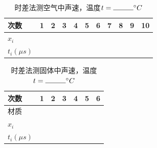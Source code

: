 \documentclass{ctexart}
\begin{document}
\begin{table}[!h]
    \centering
    \caption{时差法测空气中声速，温度$t = \rule{1cm}{0.4pt} ^\circ C$}
    \begin{tabular}{|m{1.5cm}<{\centering}|m{0.7cm}<{\centering}|m{0.7cm}<{\centering}|m{0.7cm}<{\centering}|m{0.7cm}<{\centering}|m{0.7cm}<{\centering}|m{0.7cm}<{\centering}|m{0.7cm}<{\centering}|m{0.7cm}<{\centering}|m{0.7cm}<{\centering}|m{0.7cm}<{\centering}|}
        \hline
        次数& 1 & 2 & 3 & 4 & 5 & 6 & 7 & 8 & 9 & 10 \\ 
        \hline
        $x_i$& & & & & & & & & & \\
        \hline
        $t_i(\mu s)$& & & & & & & & & & \\
        \hline
    \end{tabular}
\end{table}

\begin{table}[!h]
    \centering
    \caption{时差法测固体中声速，温度$t = \rule{1cm}{0.4pt} ^\circ C$}
    \begin{tabular}{|m{1.5cm}<{\centering}|m{1.2cm}<{\centering}|m{1.2cm}<{\centering}|m{1.2cm}<{\centering}|m{1.2cm}<{\centering}|m{1.2cm}<{\centering}|m{1.2cm}<{\centering}|}
        \hline
        次数& 1 & 2 & 3 & 4 & 5 & 6  \\ 
        \hline
        材质& \multicolumn{3}{c|}{} & \multicolumn{3}{c|}{} \\
        \hline
        $x_i$& & & & & &  \\
        \hline
        $t_i(\mu s)$& & & & & & \\
        \hline
    \end{tabular}
\end{table}


\newpage
\end{document}

